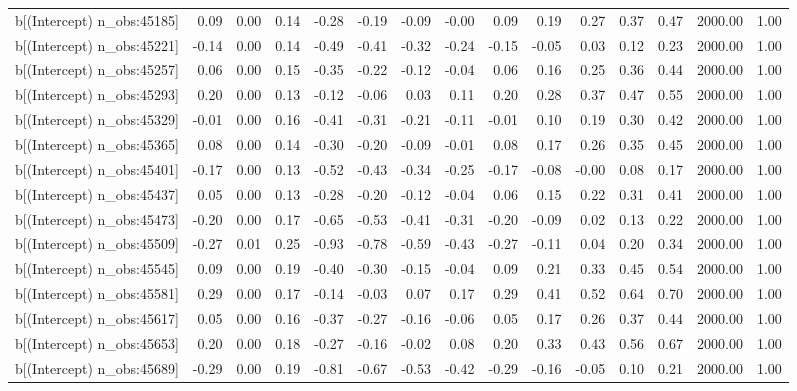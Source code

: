 \begin{table}[ht]
\begin{tabular}{rrrrrrrrrrrrrrr}
  b[(Intercept) n\_obs:45185] & 0.09 & 0.00 & 0.14 & -0.28 & -0.19 & -0.09 & -0.00 & 0.09 & 0.19 & 0.27 & 0.37 & 0.47 & 2000.00 & 1.00 \\ 
  b[(Intercept) n\_obs:45221] & -0.14 & 0.00 & 0.14 & -0.49 & -0.41 & -0.32 & -0.24 & -0.15 & -0.05 & 0.03 & 0.12 & 0.23 & 2000.00 & 1.00 \\ 
  b[(Intercept) n\_obs:45257] & 0.06 & 0.00 & 0.15 & -0.35 & -0.22 & -0.12 & -0.04 & 0.06 & 0.16 & 0.25 & 0.36 & 0.44 & 2000.00 & 1.00 \\ 
  b[(Intercept) n\_obs:45293] & 0.20 & 0.00 & 0.13 & -0.12 & -0.06 & 0.03 & 0.11 & 0.20 & 0.28 & 0.37 & 0.47 & 0.55 & 2000.00 & 1.00 \\ 
  b[(Intercept) n\_obs:45329] & -0.01 & 0.00 & 0.16 & -0.41 & -0.31 & -0.21 & -0.11 & -0.01 & 0.10 & 0.19 & 0.30 & 0.42 & 2000.00 & 1.00 \\ 
  b[(Intercept) n\_obs:45365] & 0.08 & 0.00 & 0.14 & -0.30 & -0.20 & -0.09 & -0.01 & 0.08 & 0.17 & 0.26 & 0.35 & 0.45 & 2000.00 & 1.00 \\ 
  b[(Intercept) n\_obs:45401] & -0.17 & 0.00 & 0.13 & -0.52 & -0.43 & -0.34 & -0.25 & -0.17 & -0.08 & -0.00 & 0.08 & 0.17 & 2000.00 & 1.00 \\ 
  b[(Intercept) n\_obs:45437] & 0.05 & 0.00 & 0.13 & -0.28 & -0.20 & -0.12 & -0.04 & 0.06 & 0.15 & 0.22 & 0.31 & 0.41 & 2000.00 & 1.00 \\ 
  b[(Intercept) n\_obs:45473] & -0.20 & 0.00 & 0.17 & -0.65 & -0.53 & -0.41 & -0.31 & -0.20 & -0.09 & 0.02 & 0.13 & 0.22 & 2000.00 & 1.00 \\ 
  b[(Intercept) n\_obs:45509] & -0.27 & 0.01 & 0.25 & -0.93 & -0.78 & -0.59 & -0.43 & -0.27 & -0.11 & 0.04 & 0.20 & 0.34 & 2000.00 & 1.00 \\ 
  b[(Intercept) n\_obs:45545] & 0.09 & 0.00 & 0.19 & -0.40 & -0.30 & -0.15 & -0.04 & 0.09 & 0.21 & 0.33 & 0.45 & 0.54 & 2000.00 & 1.00 \\ 
  b[(Intercept) n\_obs:45581] & 0.29 & 0.00 & 0.17 & -0.14 & -0.03 & 0.07 & 0.17 & 0.29 & 0.41 & 0.52 & 0.64 & 0.70 & 2000.00 & 1.00 \\ 
  b[(Intercept) n\_obs:45617] & 0.05 & 0.00 & 0.16 & -0.37 & -0.27 & -0.16 & -0.06 & 0.05 & 0.17 & 0.26 & 0.37 & 0.44 & 2000.00 & 1.00 \\ 
  b[(Intercept) n\_obs:45653] & 0.20 & 0.00 & 0.18 & -0.27 & -0.16 & -0.02 & 0.08 & 0.20 & 0.33 & 0.43 & 0.56 & 0.67 & 2000.00 & 1.00 \\ 
  b[(Intercept) n\_obs:45689] & -0.29 & 0.00 & 0.19 & -0.81 & -0.67 & -0.53 & -0.42 & -0.29 & -0.16 & -0.05 & 0.10 & 0.21 & 2000.00 & 1.00 \\ 

\end{tabular}
\end{table}
